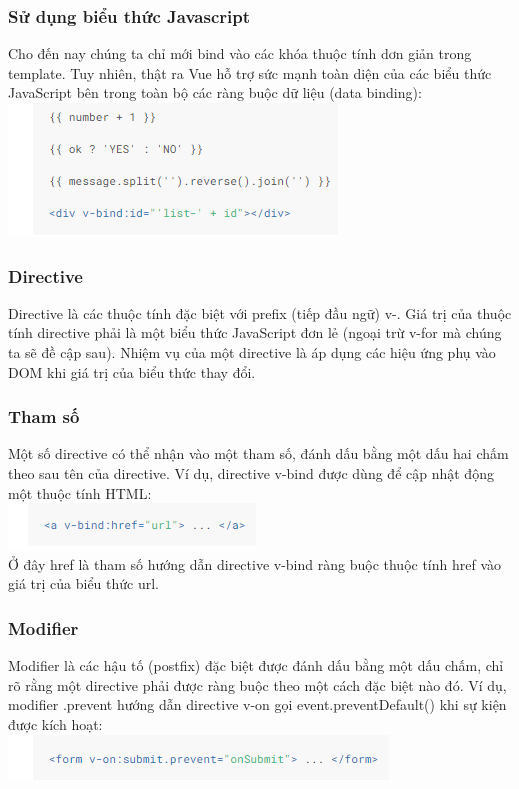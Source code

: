 \documentclass[12pt,a4paper]{report}
\begin{document}
\subsubsection{Sử dụng biểu thức Javascript}
Cho đến nay chúng ta chỉ mới bind vào các khóa thuộc tính dơn giản trong template. Tuy nhiên, thật ra Vue hỗ trợ sức mạnh toàn diện của các biểu thức JavaScript bên trong toàn bộ các ràng buộc dữ liệu (data binding):\\
\includegraphics[scale=1]{13}
\subsubsection{Directive}
Directive là các thuộc tính đặc biệt với prefix (tiếp đầu ngữ) v-. Giá trị của thuộc tính directive phải là một biểu thức JavaScript đơn lẻ (ngoại trừ v-for mà chúng ta sẽ đề cập sau). Nhiệm vụ của một directive là áp dụng các hiệu ứng phụ vào DOM khi giá trị của biểu thức thay đổi.
\subsubsection{Tham số}
Một số directive có thể nhận vào một tham số, đánh dấu bằng một dấu hai chấm theo sau tên của directive. Ví dụ, directive v-bind được dùng để cập nhật động một thuộc tính HTML:\\
\includegraphics[scale=1]{14}\\Ở đây href là tham số hướng dẫn directive v-bind ràng buộc thuộc tính href vào giá trị của biểu thức url.
\subsubsection{Modifier}
Modifier là các hậu tố (postfix) đặc biệt được đánh dấu bằng một dấu chấm, chỉ rõ rằng một directive phải được ràng buộc theo một cách đặc biệt nào đó. Ví dụ, modifier .prevent hướng dẫn directive v-on gọi event.preventDefault() khi sự kiện được kích hoạt:\\\includegraphics[scale=1]{15}
\end{document}
